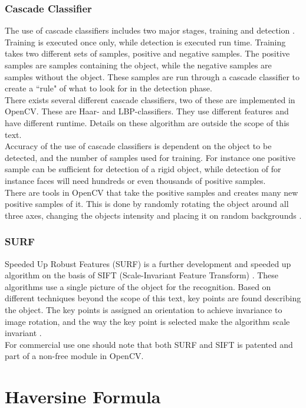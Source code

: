 \subsubsection{Cascade Classifier}
The use of cascade classifiers includes two major stages, training and detection \citep{cascade}. Training is executed once only, while detection is executed run time. Training takes two different sets of samples, positive and negative samples. The positive samples are samples containing the object, while the negative samples are samples without the object. These samples are run through a cascade classifier to create a ``rule" of what to look for in the detection phase.\\\newline
There exists several different cascade classifiers, two of these are implemented in OpenCV. These are Haar- and LBP-classifiers. They use different features and have different runtime. Details on these algorithm are outside the scope of this text.\\
\newline
Accuracy of the use of cascade classifiers is dependent on the object to be detected, and the number of samples used for training. For instance one positive sample can be sufficient for detection of a rigid object, while detection of for instance faces will need hundreds or even thousands of positive samples.\\\newline
There are tools in OpenCV that take the positive samples and creates many new positive samples of it. This is done by randomly rotating the object around all three axes, changing the objects intensity and placing it on random backgrounds \citep{cascade}.
\subsubsection{SURF}
Speeded Up Robust Features (SURF) is a further development and speeded up algorithm on the basis of SIFT (Scale-Invariant Feature Transform) \citep{surf}. These algorithms use a single picture of the object for the recognition. Based on different techniques beyond the scope of this text, key points are found describing the object. The key points is assigned an orientation to achieve invariance to image rotation, and the way the key point is selected make the algorithm scale invariant \citep{sift}.\\\newline
For commercial use one should note that both SURF and SIFT is patented and part of a non-free module in OpenCV.
\section{Haversine Formula}